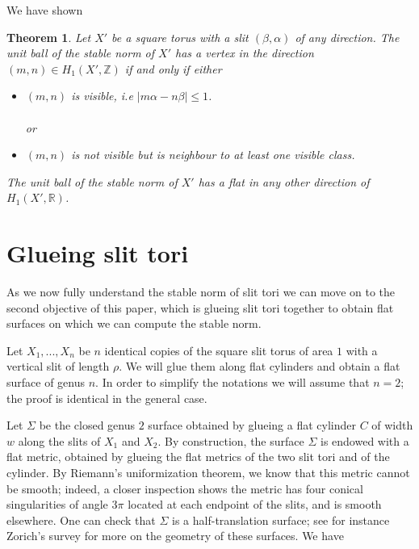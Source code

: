 \documentclass{article}
\newcommand{\RR}{\mathbb{R}}
\newcommand{\ZZ}{\mathbb{Z}}
\newtheorem{thm}{Theorem}[section]
\theoremstyle{definition}
\begin{document}
We have shown

\begin{thm}
    Let $X'$ be a square torus with a slit $(\beta,\alpha)$ of any direction. The unit ball of the stable norm of $X'$ has a vertex in the direction $(m,n)\in H_1(X',\ZZ)$ if and only if either
    \begin{itemize}\renewcommand{\labelitemi}{$\bullet$}
    \item $(m,n)$ is visible, i.e $|m\alpha - n\beta| \le 1$. \\ \\
    or 
    \item $(m,n)$ is not visible but is neighbour to at least one visible class.
    \end{itemize}
    The unit ball of the stable norm of $X'$ has a flat in any other direction of $H_1(X',\RR)$.
\end{thm}








\section{Glueing slit tori}

As we now fully understand the stable norm of slit tori we can move on to the second objective of this paper, which is glueing slit tori together to obtain flat surfaces on which we can compute the stable norm. \newline \newline 


Let $X_1,...,X_n$ be $n$ identical copies of the square slit torus of area $1$ with a vertical slit of length $\rho$. We will glue them along flat cylinders and obtain a flat surface of genus $n$. In order to simplify the notations we will assume that $n=2$; the proof is identical in the general case. \newline

Let $\Sigma$ be the closed genus $2$ surface obtained by glueing a flat cylinder $C$ of width $w$ along the slits of $X_1$ and $X_2$. By construction, the surface $\Sigma$ is endowed with a flat metric, obtained by glueing the flat metrics of the two slit tori and of the cylinder. By Riemann's uniformization theorem, we know that this metric cannot be smooth; indeed, a closer inspection shows the metric has four conical singularities of angle $3 \pi$ located at each endpoint of the slits, and is smooth elsewhere. One can check that $\Sigma$ is a half-translation surface; see for instance Zorich's survey \cite{Zorich} for more on the geometry of these surfaces. We have
\end{document}
